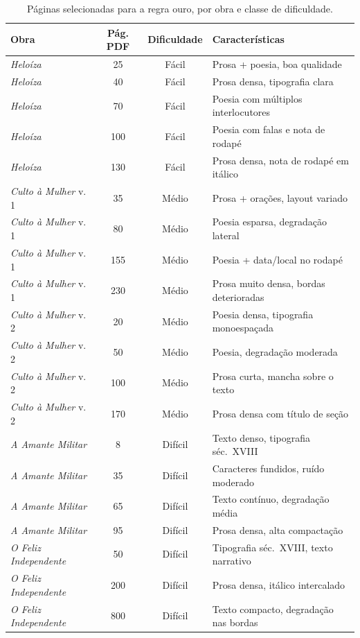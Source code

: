 \documentclass[noabntexcite,oneside]{ufsc-thesis-rn46-2019}
\begin{document}
\begin{table}[htb]
\centering
\caption{Páginas selecionadas para a regra ouro, por obra e classe de dificuldade.}
\label{tab:paginas_corpus}
\renewcommand{\arraystretch}{1.3}
\begin{tabular}{L{4.5cm} c c L{5cm}}
\hline
\textbf{Obra} & \textbf{Pág. PDF} & \textbf{Dificuldade} & \textbf{Características} \\
\hline
\textit{Heloíza}              & 25  & Fácil   & Prosa + poesia, boa qualidade \\
\textit{Heloíza}              & 40  & Fácil   & Prosa densa, tipografia clara \\
\textit{Heloíza}              & 70  & Fácil   & Poesia com múltiplos interlocutores \\
\textit{Heloíza}              & 100 & Fácil   & Poesia com falas e nota de rodapé \\
\textit{Heloíza}              & 130 & Fácil   & Prosa densa, nota de rodapé em itálico \\
\hline
\textit{Culto à Mulher} v.\,1 & 35  & Médio   & Prosa + orações, layout variado \\
\textit{Culto à Mulher} v.\,1 & 80  & Médio   & Poesia esparsa, degradação lateral \\
\textit{Culto à Mulher} v.\,1 & 155 & Médio   & Poesia + data/local no rodapé \\
\textit{Culto à Mulher} v.\,1 & 230 & Médio   & Prosa muito densa, bordas deterioradas \\
\textit{Culto à Mulher} v.\,2 & 20  & Médio   & Poesia densa, tipografia monoespaçada \\
\textit{Culto à Mulher} v.\,2 & 50  & Médio   & Poesia, degradação moderada \\
\textit{Culto à Mulher} v.\,2 & 100 & Médio   & Prosa curta, mancha sobre o texto \\
\textit{Culto à Mulher} v.\,2 & 170 & Médio   & Prosa densa com título de seção \\
\hline
\textit{A Amante Militar}     & 8   & Difícil & Texto denso, tipografia séc.\ XVIII \\
\textit{A Amante Militar}     & 35  & Difícil & Caracteres fundidos, ruído moderado \\
\textit{A Amante Militar}     & 65  & Difícil & Texto contínuo, degradação média \\
\textit{A Amante Militar}     & 95  & Difícil & Prosa densa, alta compactação \\
\textit{O Feliz Independente} & 50  & Difícil & Tipografia séc.\ XVIII, texto narrativo \\
\textit{O Feliz Independente} & 200 & Difícil & Prosa densa, itálico intercalado \\
\textit{O Feliz Independente} & 800 & Difícil & Texto compacto, degradação nas bordas \\
\hline
\end{tabular}
\end{table}
\end{document}
